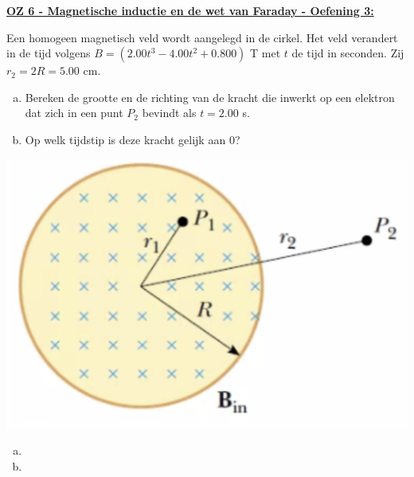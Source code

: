 \textbf{\underline{OZ 6 - Magnetische inductie en de wet van Faraday - Oefening 3:}}
\vspace{0.5cm}

    \begin{minipage}{.76\textwidth}
        Een homogeen magnetisch veld wordt aangelegd in de cirkel. Het veld verandert in de tijd volgens $B = (2.00t^3 - 4.00t^2 +0.800) $ T met $t$ de tijd in seconden. Zij $r_2 = 2R = 5.00$ cm.

        \begin{enumerate}[(a)]
            \item Bereken de grootte en de richting van de kracht die inwerkt op een elektron dat zich in een punt $P_2$ bevindt als $t = 2.00$ s.
            \item Op welk tijdstip is deze kracht gelijk aan $0$?
        \end{enumerate}    
    \end{minipage}
    \hspace{0.5cm}\begin{minipage}{.2\textwidth}
        \includegraphics[scale = 0.22]{oz06/resources/Oz6Oef3.png}
    \end{minipage}

    \begin{enumerate}[(a)]
        \item     
            \begin{description}[labelwidth=1.5cm, leftmargin=!]
                \item[Geg. :]
                \item[Gevr. :] 
                \item[Opl. :]
            \end{description}
        \item     
            \begin{description}[labelwidth=1.5cm, leftmargin=!]
                \item[Geg. :]
                \item[Gevr. :] 
                \item[Opl. :]
            \end{description}
    \end{enumerate}



\vspace{1cm}